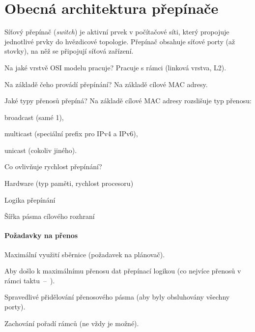 
\section{Obecná architektura přepínače}

Síťový přepínač (\textit{switch}) je aktivní prvek v počítačové síti, který propojuje jednotlivé prvky do hvězdicové topologie. Přepínač obsahuje síťové porty (až stovky), na něž se připojují síťová zařízení. \begin{compactitem}
    \item Na jaké vrstvě OSI modelu pracuje? Pracuje s rámci (linková vrstva, L2).
    \item Na základě čeho provádí přepínání? Na základě cílové MAC adresy.
    \item Jaké typy přenosů přepíná? Na základě cílové MAC adresy rozslišuje typ přenosu: \begin{compactitem}
        \item broadcast (samé 1),
        \item multicast (speciální prefix pro IPv4 a IPv6),
        \item unicast (cokoliv jiného).
    \end{compactitem}
    \item Co ovlivňuje rychlost přepínání? \begin{compactitem}
        \item Hardware (typ paměti, rychlost procesoru)
        \item Logika přepínání
        \item Šířka pásma cílového rozhraní
    \end{compactitem}
\end{compactitem}

\paragraph*{Požadavky na přenos} \begin{compactitem}
    \item Maximální využití sběrnice (požadavek na plánovač). \begin{compactitem}
        \item Aby došlo k maximálnímu přenosu dat přepínací logikou (co nejvíce přenosů v rámci taktu~--~).
    \end{compactitem}
    \item Spravedlivé přidělování přenosového pásma (aby byly obsluhovány všechny porty).
    \item Zachování pořadí rámců (ne vždy je možné).
\end{compactitem}

